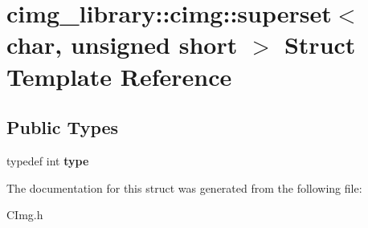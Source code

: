 \hypertarget{structcimg__library_1_1cimg_1_1superset_3_01char_00_01unsigned_01short_01_4}{\section{cimg\-\_\-library\-:\-:cimg\-:\-:superset$<$ char, unsigned short $>$ Struct Template Reference}
\label{structcimg__library_1_1cimg_1_1superset_3_01char_00_01unsigned_01short_01_4}
}
\subsection*{Public Types}
\begin{DoxyCompactItemize}
\item 
\hypertarget{structcimg__library_1_1cimg_1_1superset_3_01char_00_01unsigned_01short_01_4_ace221f6fc2535cb829a0b131f2546066}{typedef int {\bfseries type}}\label{structcimg__library_1_1cimg_1_1superset_3_01char_00_01unsigned_01short_01_4_ace221f6fc2535cb829a0b131f2546066}

\end{DoxyCompactItemize}


The documentation for this struct was generated from the following file\-:\begin{DoxyCompactItemize}
\item 
C\-Img.\-h\end{DoxyCompactItemize}
